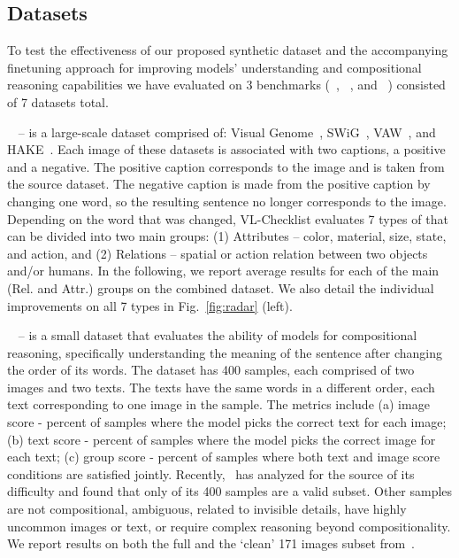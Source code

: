 \subsection{Datasets}\label{sec:datasets}
To test the effectiveness of our proposed \ourdataset{} synthetic dataset and the accompanying finetuning approach for improving \vl{} models' \vlc{} understanding and compositional reasoning capabilities we have evaluated on 3 benchmarks (\winoground{}~\cite{winoground}, \vlchecklist{}~\cite{vlc}, and \ARO{}~\cite{aro}) consisted of 7 datasets total.

\noindent\textbf{\vlchecklist{}~\cite{vlc}} -- is a large-scale dataset comprised of: Visual Genome~\cite{vg}, SWiG~\cite{swig}, VAW~\cite{vaw}, and HAKE~\cite{hake}. Each image of these datasets is associated with two captions, a positive and a negative. The positive caption corresponds to the image and is taken from the source dataset. The negative caption is made from the positive caption by changing one word, so the resulting sentence no longer corresponds to the image. Depending on the word that was changed, VL-Checklist evaluates 7 types of \vlc{} that can be divided into two main groups: (1) Attributes -- color, material, size, state, and action, and (2) Relations -- spatial or action relation between two objects and/or humans. In the following, we report average results for each of the main (Rel. and Attr.) groups on the combined \vlchecklist{} dataset. We also detail the individual improvements on all 7 \vlc{} types in Fig.~\ref{fig:radar} (left).

\noindent\textbf{\winoground{}~\cite{winoground}} -- is a small dataset that evaluates the ability of \vl{} models for compositional reasoning, specifically understanding the meaning of the sentence after changing the order of its words. The dataset has 400 samples, each comprised of two images and two texts. The texts have the same words in a different order, each text corresponding to one image in the sample. The \winoground{} metrics include (a) image score - percent of samples where the model picks the correct text for each image; (b) text score - percent of samples where the model picks the correct image for each text; (c) group score - percent of samples where both text and image score conditions are satisfied jointly. Recently,~\cite{why_is_winoground_hard} has analyzed \winoground{} for the source of its difficulty and found that only  of its 400 samples are a valid subset. Other samples are not compositional, ambiguous, related to invisible details, have highly uncommon images or text, or require complex reasoning beyond compositionality. We report results on both the full \winoground{} and the `clean' 171 images subset from~\cite{why_is_winoground_hard}.

